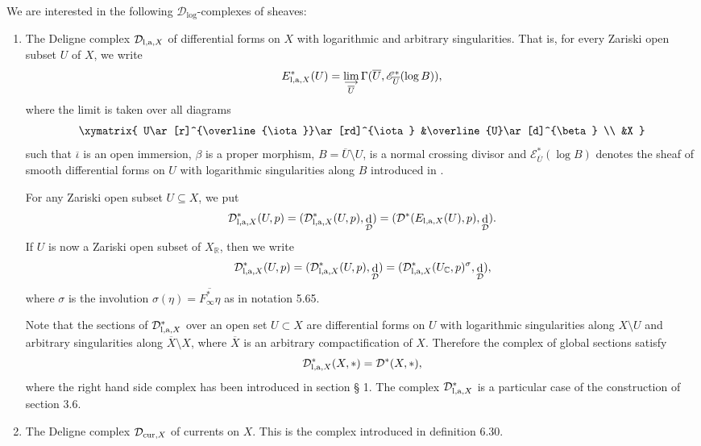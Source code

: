 \documentclass[10pt,twoside]{article}
\numberwithin{equation}{section}
\theoremstyle{plain}
\theoremstyle{definition}
\DeclareMathOperator{\dd}{d}
\newcommand{\las}{{\text{\rm l,a}}}
\newcommand{\D}{\text{{\rm cur}}}
\begin{document}
We are interested in the following $\mathcal{D}_{\log}$-complexes of
sheaves:
\begin{enumerate}
\item The Deligne complex $\mathcal{D}_{\las,X}$ of
differential forms on $X$ with logarithmic and arbitrary
singularities. That is, for every Zariski open subset $U$ of $X$, we
write
\begin{displaymath}
E^{\ast}_{\las,X}(U)=\lim_{\substack{\longrightarrow \\
\overline{U}}}\Gamma(\overline{U},\mathscr{E}^{\ast}_{\overline{U}}
(\log B)),
\end{displaymath}
where the limit is taken over all diagrams
\begin{displaymath}
\xymatrix{
U\ar[r]^{\overline{\iota}}\ar[rd]^{\iota}
&\overline{U}\ar[d]^{\beta} \\
&X
}
\end{displaymath}
such that $\overline{\iota}$ is an open immersion, $\beta $ is a
proper morphism, $B=\overline{U}\setminus U$, 
is a normal crossing divisor and $\mathscr{E}^{\ast}_{\overline{U}}
(\log B)$ denotes the sheaf of smooth differential forms on $U$ with
logarithmic singularities along $B$ introduced in \cite{Burgos:CDc} .

For any Zariski open subset $U\subseteq X$, we put
\begin{displaymath}
\mathcal{D}^{\ast}_{\las,X}(U,p)=(\mathcal{D}^{\ast}_
{\las,X}(U,p),\dd_{\mathcal{D}})=(\mathcal{D}^{\ast}
(E_{\las,X}(U),p),\dd_{\mathcal{D}}).
\end{displaymath}
If $U$ is now a Zariski open subset of $X_{\mathbb{R}}$, then 
we write
\begin{displaymath}
\mathcal{D}^{\ast}_{\las,X}(U,p)=(\mathcal{D}^{\ast}_
{\las,X}(U,p),\dd_{\mathcal{D}})=
(\mathcal{D}^{\ast}_{\las,X}(U_{\mathbb{C}},p)^{\sigma},  
\dd_{\mathcal  {D}}),
\end{displaymath}
where $\sigma$ is the involution $\sigma (\eta)=\overline
{F_{\infty}^{\ast}\eta}$ as in \cite{BurgosKramerKuehn:cacg}
notation 5.65.

Note that the
sections of $\mathcal{D}^{\ast}_{\las,X}$ over an open set $U\subset X$ are
differential forms on $U$ with logarithmic singularities along
$X\setminus U$ and arbitrary singularities along
$\overline{X}\setminus X$, where $\overline{X}$ is an arbitrary
compactification of $X$. Therefore the complex of global sections
satisfy
\begin{displaymath}
  \mathcal{D}^{\ast}_{\las,X}(X,*)=\mathcal{D}^{\ast}(X,\ast),
\end{displaymath}
where the right hand side complex has been introduced in section \S
1. The complex $\mathcal{D}^{\ast}_{\las,X}$ is a particular case of
the construction 
of \cite{BurgosKramerKuehn:accavb} section 3.6. 

\item The Deligne complex $\mathcal{D}_{\D, X}$ 
of currents on $X$. This is the complex introduced in
\cite{BurgosKramerKuehn:cacg} definition 6.30.
\end{enumerate}
\end{document}
